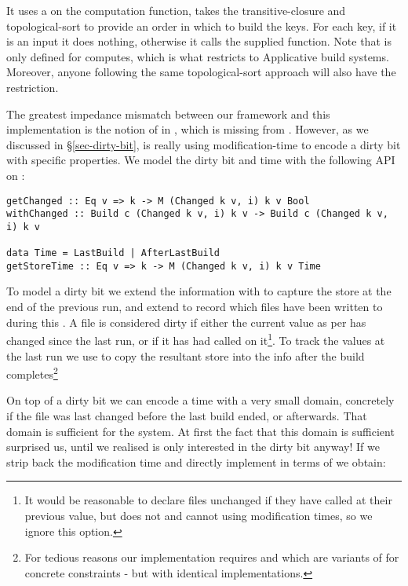It uses a  on the computation function, takes the transitive-closure and topological-sort to provide an order in which to build the keys. For each key, if it is an input it does nothing, otherwise it calls the supplied  function. Note that  is only defined for  computes, which is what restricts \Make to Applicative build systems. Moreover, anyone following the same topological-sort approach will also have the  restriction.

The greatest impedance mismatch between our framework and this implementation is the notion of  in , which is missing from . However, as we discussed in \S\ref{sec-dirty-bit}, \Make is really using modification-time to encode a dirty bit with specific properties. We model the dirty bit and time with the following API on :

\begin{verbatim}
getChanged :: Eq v => k -> M (Changed k v, i) k v Bool
withChanged :: Build c (Changed k v, i) k v -> Build c (Changed k v, i) k v

data Time = LastBuild | AfterLastBuild
getStoreTime :: Eq v => k -> M (Changed k v, i) k v Time
\end{verbatim}

To model a dirty bit we extend the  information with  to capture the  store at the end of the previous run, and extend  to record which files have been written to during this . A file is considered dirty if either the current value as per  has changed since the last run, or if it has had  called on it\footnote{It would be reasonable to declare files unchanged if they have  called at their previous value, but \Excel does not and \Make cannot using modification times, so we ignore this option.}. To track the values at the last run we use  to copy the resultant  store into the info after the build completes\footnote{For tedious reasons our implementation requires  and  which are variants of  for concrete constraints  - but with identical implementations.}

On top of a dirty bit we can encode a time with a very small domain, concretely if the file was last changed before the last build ended, or afterwards. That domain is sufficient for the \Make system. At first the fact that this domain is sufficient surprised us, until we realised \Make is only interested in the dirty bit anyway! If we strip back the modification time and directly implement \Make in terms of  we obtain:

